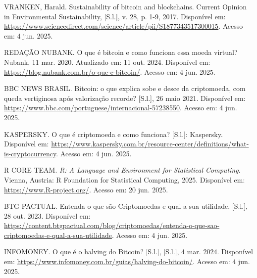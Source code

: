 \renewcommand{\refname}{}  %
\vspace*{-1.5cm}           %

\begin{thebibliography}{26}
\sloppy

     VRANKEN, Harald. Sustainability of bitcoin and blockchains. Current Opinion in Environmental Sustainability, [S.l.], v. 28, p. 1-9, 2017. Disponível em: 
    \href{https://www.sciencedirect.com/science/article/pii/S1877343517300015}{https://www.sciencedirect.com/science/article/pii/S1877343517300015}.
    Acesso em: 4 jun. 2025.
    
     REDAÇÃO NUBANK. O que é bitcoin e como funciona essa moeda virtual? Nubank, 11 mar. 2020. Atualizado em: 11 out. 2024. Disponível em: 
    \href{https://blog.nubank.com.br/o-que-e-bitcoin/}{https://blog.nubank.com.br/o-que-e-bitcoin/}.
    Acesso em: 4 jun. 2025.
    
     BBC NEWS BRASIL. Bitcoin: o que explica sobe e desce da criptomoeda, com queda vertiginosa após valorização recorde? [S.l.], 26 maio 2021. Disponível em: 
    \href{https://www.bbc.com/portuguese/internacional-57238550}{https://www.bbc.com/portuguese/internacional-57238550}.
    Acesso em: 4 jun. 2025.
    
     KASPERSKY. O que é criptomoeda e como funciona? [S.l.]: Kaspersky. Disponível em: 
    \href{https://www.kaspersky.com.br/resource-center/definitions/what-is-cryptocurrency}{https://www.kaspersky.com.br/resource-center/definitions/what-is-cryptocurrency}. 
    Acesso em: 4 jun. 2025.

     R CORE TEAM. \textit{R: A Language and Environment for Statistical Computing}. Vienna, Austria: R Foundation for Statistical Computing, 2025. Disponível em: 
    \href{https://www.R-project.org/}{https://www.R-project.org/}. 
    Acesso em: 20 jun. 2025.
    
     BTG PACTUAL. Entenda o que são Criptomoedas e qual a sua utilidade. [S.l.],  28 out. 2023. Disponível em: 
    \href{https://content.btgpactual.com/blog/criptomoedas/entenda-o-que-sao-criptomoedas-e-qual-a-sua-utilidade}{https://content.btgpactual.com/blog/criptomoedas/entenda-o-que-sao-criptomoedas-e-qual-a-sua-utilidade}. 
    Acesso em: 4 jun. 2025.
    
     INFOMONEY. O que é o halving do Bitcoin? [S.l.], [S.l.], 4 mar. 2024. Disponível em: 
    \href{https://www.infomoney.com.br/guias/halving-do-bitcoin/}{https://www.infomoney.com.br/guias/halving-do-bitcoin/}. 
    Acesso em: 4 jun. 2025.
    

\end{thebibliography}
